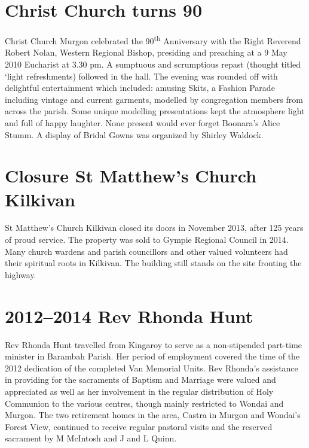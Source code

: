 \hypertarget{christ-church-turns-90}{%
\section{Christ Church turns 90}\label{christ-church-turns-90}}

Christ Church Murgon celebrated the 90\textsuperscript{th} Anniversary with the Right Reverend Robert Nolan, Western Regional Bishop, presiding and preaching at a 9 May 2010 Eucharist at 3.30 pm. A sumptuous and scrumptious repast (thought titled `light refreshments) followed in the hall. The evening was rounded off with delightful entertainment which included: amusing Skits, a Fashion Parade including vintage and current garments, modelled by congregation members from across the parish. Some unique modelling presentations kept the atmosphere light and full of happy laughter. None present would ever forget Boonara's Alice Stumm. A display of Bridal Gowns was organized by Shirley Waldock.

\hypertarget{closure-st-matthews-church-kilkivan}{%
\section{Closure St Matthew's Church Kilkivan}\label{closure-st-matthews-church-kilkivan}}

St Matthew's Church Kilkivan closed its doors in November 2013, after 125 years of proud service. The property was sold to Gympie Regional Council in 2014. Many church wardens and parish councillors and other valued volunteers had their spiritual roots in Kilkivan. The building still stands on the site fronting the highway.

\hypertarget{rev-rhonda-hunt}{%
\section{2012--2014 Rev Rhonda Hunt}\label{rev-rhonda-hunt}}

Rev Rhonda Hunt travelled from Kingaroy to serve as a non-stipended part-time minister in Barambah Parish. Her period of employment covered the time of the 2012 dedication of the completed Van Memorial Units. Rev Rhonda's assistance in providing for the sacraments of Baptism and Marriage were valued and appreciated as well as her involvement in the regular distribution of Holy Communion to the various centres, though mainly restricted to Wondai and Murgon. The two retirement homes in the area, Castra in Murgon and Wondai's Forest View, continued to receive regular pastoral visits and the reserved sacrament by M McIntosh and J and L Quinn.

